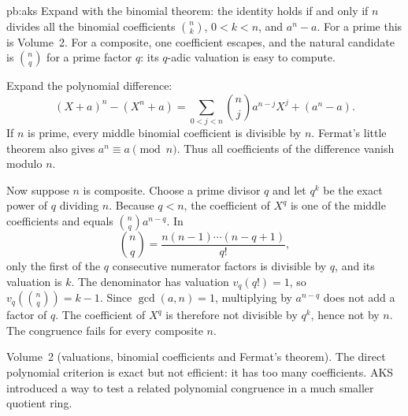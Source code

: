 \begin{solution}{pb:aks}
\idea Expand with the binomial theorem: the identity holds if and only if $n$ divides all the binomial coefficients $\binom nk$,
$0<k<n$, and $a^n-a$. For a prime this is Volume~2. For a composite, one coefficient escapes, and the natural candidate is
$\binom nq$ for a prime factor $q$: its $q$-adic valuation is easy to compute.

\writeup Expand the polynomial difference:
\[
(X+a)^n-(X^n+a)
=\sum_{0<j<n}\binom nj a^{n-j}X^j+(a^n-a).
\]
If $n$ is prime, every middle binomial coefficient is divisible by $n$. Fermat's little theorem also gives $a^n\equiv a\pmod n$. Thus all coefficients of the difference vanish modulo $n$.

Now suppose $n$ is composite. Choose a prime divisor $q$ and let $q^k$ be the exact power of $q$ dividing $n$. Because $q<n$, the coefficient of $X^q$ is one of the middle coefficients and equals $\binom nq a^{n-q}$. In
\[
\binom nq=\frac{n(n-1)\cdots(n-q+1)}{q!},
\]
only the first of the $q$ consecutive numerator factors is divisible by $q$, and its valuation is $k$. The denominator has valuation $v_q(q!)=1$, so
$v_q(\binom nq)=k-1$. Since $\gcd(a,n)=1$, multiplying by $a^{n-q}$ does not add a factor of $q$. The coefficient of $X^q$ is therefore not divisible by $q^k$, hence not by $n$. The congruence fails for every composite $n$.

\tools Volume~2 (valuations, binomial coefficients and Fermat's theorem).
\leads The direct polynomial criterion is exact but not efficient: it has too many coefficients. AKS introduced a way to test a related polynomial congruence in a much smaller quotient ring.
\end{solution}

